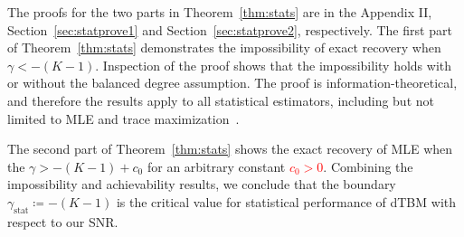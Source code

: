 \documentclass[lettersize,onecolumn,journal]{IEEEtran}
\theoremstyle{definition}
\newtheorem{thm}{Theorem}
\theoremstyle{definition}
\begin{document}
{The proofs for the two parts in Theorem~\ref{thm:stats} are in the Appendix II, Section~\ref{sec:statprove1} and Section~\ref{sec:statprove2}, respectively. The first part of Theorem~\ref{thm:stats} demonstrates the impossibility of exact recovery when $\gamma < -(K-1)$. Inspection of the proof shows that the impossibility holds with or without the balanced degree assumption. %
The proof is information-theoretical, and therefore the results apply to all statistical estimators, including but not limited to MLE and trace maximization~\citep{ghoshdastidar2017uniform}. 

The second part of Theorem~\ref{thm:stats} shows the exact recovery of MLE when the $\gamma>-(K-1)+c_0$ for an arbitrary constant \textcolor{red}{$c_0>0$}. Combining the impossibility and achievability results, we conclude that the boundary $\gamma_{\text{stat}} \coloneqq -(K-1)$ is the critical value for statistical performance of dTBM with respect to our SNR.
}




\end{document}
